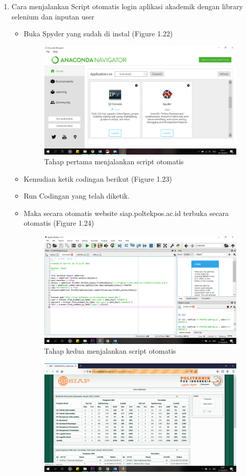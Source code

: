 \begin{enumerate}
\item Cara menjalankan Script otomatis login aplikasi akademik dengan library selenium dan inputan user
\begin{itemize}
\item Buka Spyder yang sudah di instal (Figure 1.22)
\begin{figure}[!htbp]
\centering
\includegraphics[scale=1]{figures/S1.png}
\caption{Tahap pertama menjalankan script otomatis}
\end{figure}
\item Kemudian ketik codingan berikut (Figure 1.23)
\item Run Codingan yang telah diketik.
\item Maka secara otomatis website siap.poltekpos.ac.id terbuka secara otomatis (Figure 1.24)
\begin{figure}[!htbp]
\centering
\includegraphics[scale=0.2]{figures/S4.png}
\caption{Tahap kedua menjalankan script otomatis}
\end{figure}
\begin{figure}[!htbp]
\centering
\includegraphics[scale=0.2]{figures/S5.png}

\end{figure}
\end{itemize}
\end{enumerate}

